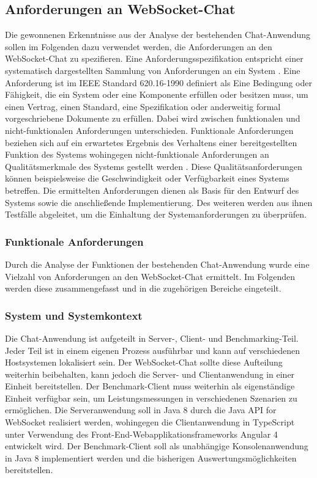 \documentclass[11pt,a4paper,titlepage]{scrartcl}
\numberwithin{equation}{section}
\begin{document}
\subsection{Anforderungen an WebSocket-Chat}
Die gewonnenen Erkenntnisse aus der Analyse der bestehenden Chat-Anwendung sollen im Folgenden dazu verwendet werden, die Anforderungen an den WebSocket-Chat zu spezifieren. Eine Anforderungsspezifikation entspricht einer systematisch dargestellten Sammlung von Anforderungen an ein System \autocite[43]{pohl_basiswissen_2009}. Eine Anforderung ist im IEEE Standard 620.16-1990 definiert als \glqq Eine Bedingung oder Fähigkeit, die ein System oder eine Komponente erfüllen oder besitzen muss, um einen Vertrag, einen Standard, eine Spezifikation oder anderweitig formal vorgeschriebene Dokumente zu erfüllen.\grqq{} Dabei wird zwischen funktionalen und nicht-funktionalen Anforderungen unterschieden. Funktionale Anforderungen beziehen sich auf ein erwartetes Ergebnis des Verhaltens einer bereitgestellten Funktion des Systems wohingegen nicht-funktionale Anforderungen an Qualitätsmerkmale des Systems gestellt werden \autocite[16]{pohl_basiswissen_2009}. Diese Qualitätsanforderungen können beispielsweise die Geschwindigkeit oder Verfügbarkeit eines Systems betreffen. Die ermittelten Anforderungen dienen als Basis für den Entwurf des Systems sowie die anschließende Implementierung. Des weiteren werden aus ihnen Testfälle abgeleitet, um die Einhaltung der Systemanforderungen zu überprüfen. 

\subsubsection{Funktionale Anforderungen}
Durch die Analyse der Funktionen der bestehenden Chat-Anwendung wurde eine Vielzahl von Anforderungen an den WebSocket-Chat ermittelt. Im Folgenden werden diese zusammengefasst und in die zugehörigen Bereiche eingeteilt.
\subsubsection*{System und Systemkontext}
Die Chat-Anwendung ist aufgeteilt in Server-, Client- und Benchmarking-Teil. Jeder Teil ist in einem eigenen Prozess ausführbar und kann auf verschiedenen Hostsystemen lokalisiert sein. Der WebSocket-Chat sollte diese Aufteilung weiterhin beibehalten, kann jedoch die Server- und Clientanwendung in einer Einheit bereitstellen. Der Benchmark-Client muss weiterhin als eigenständige Einheit verfügbar sein, um Leistungsmessungen in verschiedenen Szenarien zu ermöglichen. Die Serveranwendung soll in Java 8 durch die Java\texttrademark{} API for WebSocket realisiert werden, wohingegen die Clientanwendung in TypeScript unter Verwendung des Front-End-Webapplikationsframeworks Angular 4 entwickelt wird. Der Benchmark-Client soll als unabhängige Konsolenanwendung in Java 8 implementiert werden und die bisherigen Auswertungsmöglichkeiten bereitstellen.\\
\end{document}

